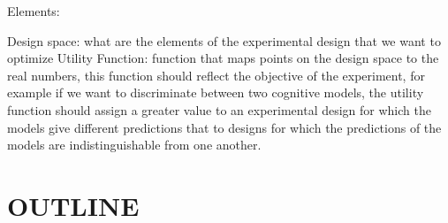 \documentclass[preprint,review,12pt]{elsarticle}
\begin{document}
% 
% 


Elements:

Design space: what are the elements of the experimental design that we want to optimize
Utility Function: function that maps points on the design space to the real numbers, this function should reflect the objective of the experiment, for example if we want to discriminate between two cognitive models, the utility function should assign a greater value to an experimental design for which the models give different predictions that to designs for which the predictions of the models are indistinguishable from one another.

\section{OUTLINE}




\end{document}
